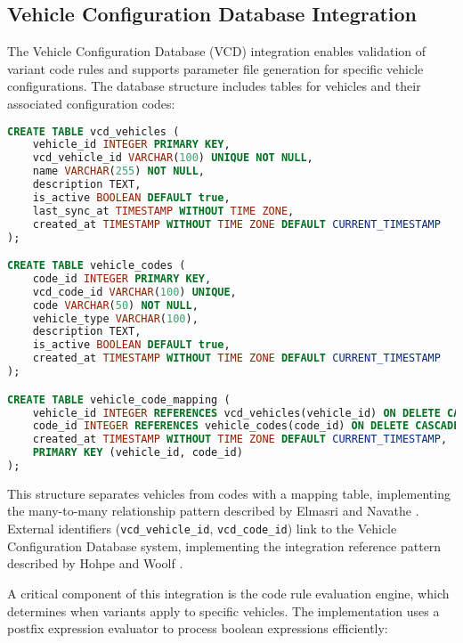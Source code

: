 \subsection{Vehicle Configuration Database Integration}
\label{subsec:vcd-integration}

The Vehicle Configuration Database (VCD) integration enables validation of variant code rules and supports parameter file generation for specific vehicle configurations. The database structure includes tables for vehicles and their associated configuration codes:

\begin{lstlisting}[language=SQL, caption={Vehicle Configuration Tables}, label={lst:vehicle-configuration}]
CREATE TABLE vcd_vehicles (
    vehicle_id INTEGER PRIMARY KEY,
    vcd_vehicle_id VARCHAR(100) UNIQUE NOT NULL,
    name VARCHAR(255) NOT NULL,
    description TEXT,
    is_active BOOLEAN DEFAULT true,
    last_sync_at TIMESTAMP WITHOUT TIME ZONE,
    created_at TIMESTAMP WITHOUT TIME ZONE DEFAULT CURRENT_TIMESTAMP
);

CREATE TABLE vehicle_codes (
    code_id INTEGER PRIMARY KEY,
    vcd_code_id VARCHAR(100) UNIQUE,
    code VARCHAR(50) NOT NULL,
    vehicle_type VARCHAR(100),
    description TEXT,
    is_active BOOLEAN DEFAULT true,
    created_at TIMESTAMP WITHOUT TIME ZONE DEFAULT CURRENT_TIMESTAMP
);

CREATE TABLE vehicle_code_mapping (
    vehicle_id INTEGER REFERENCES vcd_vehicles(vehicle_id) ON DELETE CASCADE,
    code_id INTEGER REFERENCES vehicle_codes(code_id) ON DELETE CASCADE,
    created_at TIMESTAMP WITHOUT TIME ZONE DEFAULT CURRENT_TIMESTAMP,
    PRIMARY KEY (vehicle_id, code_id)
);
\end{lstlisting}

This structure separates vehicles from codes with a mapping table, implementing the many-to-many relationship pattern described by Elmasri and Navathe \cite{elmasri2015fundamentals}. External identifiers (\texttt{vcd\_vehicle\_id}, \texttt{vcd\_code\_id}) link to the Vehicle Configuration Database system, implementing the integration reference pattern described by Hohpe and Woolf \cite{hohpe2002enterprise}.

A critical component of this integration is the code rule evaluation engine, which determines when variants apply to specific vehicles. The implementation uses a postfix expression evaluator to process boolean expressions efficiently:


